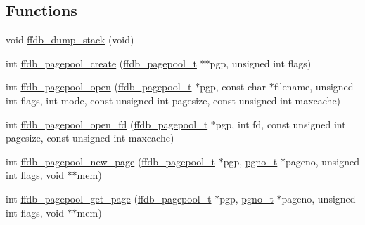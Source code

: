 \subsection*{Functions}
\begin{DoxyCompactItemize}
\item 
void \mbox{\hyperlink{adat-devel_2other__libs_2filedb_2filehash_2ffdb__pagepool_8c_a72c44f8ab92d09c2def5eadf818b8173}{ffdb\+\_\+dump\+\_\+stack}} (void)
\item 
int \mbox{\hyperlink{adat-devel_2other__libs_2filedb_2filehash_2ffdb__pagepool_8c_a07a68c49feb01ff2b1348323e3f90801}{ffdb\+\_\+pagepool\+\_\+create}} (\mbox{\hyperlink{adat-devel_2other__libs_2filedb_2filehash_2ffdb__pagepool_8h_a73290f737b0e5f8be90a0fa96ddf6ab6}{ffdb\+\_\+pagepool\+\_\+t}} $\ast$$\ast$pgp, unsigned int flags)
\item 
int \mbox{\hyperlink{adat-devel_2other__libs_2filedb_2filehash_2ffdb__pagepool_8c_ac2ee0d0b33af66cbccec9b243e2e3bc2}{ffdb\+\_\+pagepool\+\_\+open}} (\mbox{\hyperlink{adat-devel_2other__libs_2filedb_2filehash_2ffdb__pagepool_8h_a73290f737b0e5f8be90a0fa96ddf6ab6}{ffdb\+\_\+pagepool\+\_\+t}} $\ast$pgp, const char $\ast$filename, unsigned int flags, int mode, const unsigned int pagesize, const unsigned int maxcache)
\item 
int \mbox{\hyperlink{adat-devel_2other__libs_2filedb_2filehash_2ffdb__pagepool_8c_a99e8cd4bfa26d6f079224a140267e29d}{ffdb\+\_\+pagepool\+\_\+open\+\_\+fd}} (\mbox{\hyperlink{adat-devel_2other__libs_2filedb_2filehash_2ffdb__pagepool_8h_a73290f737b0e5f8be90a0fa96ddf6ab6}{ffdb\+\_\+pagepool\+\_\+t}} $\ast$pgp, int fd, const unsigned int pagesize, const unsigned int maxcache)
\item 
int \mbox{\hyperlink{adat-devel_2other__libs_2filedb_2filehash_2ffdb__pagepool_8c_a64907f28abdad3f859641b235e76bb42}{ffdb\+\_\+pagepool\+\_\+new\+\_\+page}} (\mbox{\hyperlink{adat-devel_2other__libs_2filedb_2filehash_2ffdb__pagepool_8h_a73290f737b0e5f8be90a0fa96ddf6ab6}{ffdb\+\_\+pagepool\+\_\+t}} $\ast$pgp, \mbox{\hyperlink{adat-devel_2other__libs_2filedb_2filehash_2ffdb__db_8h_a000813331643d38481142bcce7de1501}{pgno\+\_\+t}} $\ast$pageno, unsigned int flags, void $\ast$$\ast$mem)
\item 
int \mbox{\hyperlink{adat-devel_2other__libs_2filedb_2filehash_2ffdb__pagepool_8c_a5b3c5e95803e8cb5f6eee48855f12f27}{ffdb\+\_\+pagepool\+\_\+get\+\_\+page}} (\mbox{\hyperlink{adat-devel_2other__libs_2filedb_2filehash_2ffdb__pagepool_8h_a73290f737b0e5f8be90a0fa96ddf6ab6}{ffdb\+\_\+pagepool\+\_\+t}} $\ast$pgp, \mbox{\hyperlink{adat-devel_2other__libs_2filedb_2filehash_2ffdb__db_8h_a000813331643d38481142bcce7de1501}{pgno\+\_\+t}} $\ast$pageno, unsigned int flags, void $\ast$$\ast$mem)
$$
\end{DoxyCompactItemize}

